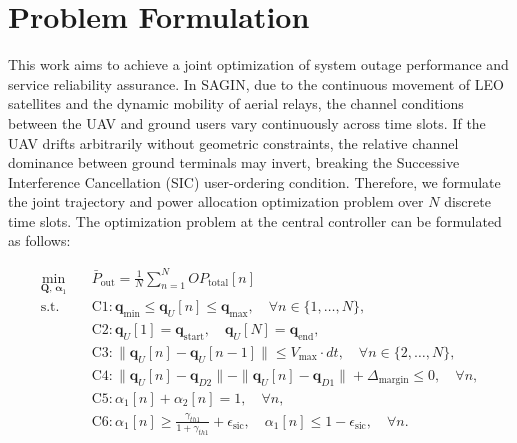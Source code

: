 \section{Problem Formulation}
\label{sec:problem_formulation}

This work aims to achieve a joint optimization of system outage performance and service reliability assurance. In SAGIN, due to the continuous movement of LEO satellites and the dynamic mobility of aerial relays, the channel conditions between the UAV and ground users vary continuously across time slots. If the UAV drifts arbitrarily without geometric constraints, the relative channel dominance between ground terminals may invert, breaking the Successive Interference Cancellation (SIC) user-ordering condition. Therefore, we formulate the joint trajectory and power allocation optimization problem over $N$ discrete time slots. The optimization problem at the central controller can be formulated as follows:

\begin{subequations}
\label{eq:opt_problem}
\begin{align}
    \min_{\mathbf{Q}, \, \boldsymbol{\alpha}_1} \quad & \bar{P}_{\text{out}} = \frac{1}{N} \sum_{n=1}^N OP_{\text{total}}[n] \label{eq:obj} \\
    \text{s.t.} \quad 
    & \text{C1}: \mathbf{q}_{\min} \le \mathbf{q}_U[n] \le \mathbf{q}_{\max}, \quad \forall n \in \{1, \dots, N\}, \label{eq:c1} \\
    & \text{C2}: \mathbf{q}_U[1] = \mathbf{q}_{\text{start}}, \quad \mathbf{q}_U[N] = \mathbf{q}_{\text{end}}, \label{eq:c2} \\
    & \text{C3}: \|\mathbf{q}_U[n] - \mathbf{q}_U[n-1]\| \le V_{\max} \cdot dt, \quad \forall n \in \{2, \dots, N\}, \label{eq:c3} \\
    & \text{C4}: \|\mathbf{q}_U[n] - \mathbf{q}_{D2}\| - \|\mathbf{q}_U[n] - \mathbf{q}_{D1}\| + \Delta_{\text{margin}} \le 0, \quad \forall n, \label{eq:c4} \\
    & \text{C5}: \alpha_1[n] + \alpha_2[n] = 1, \quad \forall n, \label{eq:c5} \\
    & \text{C6}: \alpha_1[n] \ge \frac{\gamma_{th1}}{1 + \gamma_{th1}} + \epsilon_{\text{sic}}, \quad \alpha_1[n] \le 1 - \epsilon_{\text{sic}}, \quad \forall n. \label{eq:c6}
\end{align}
\end{subequations}

